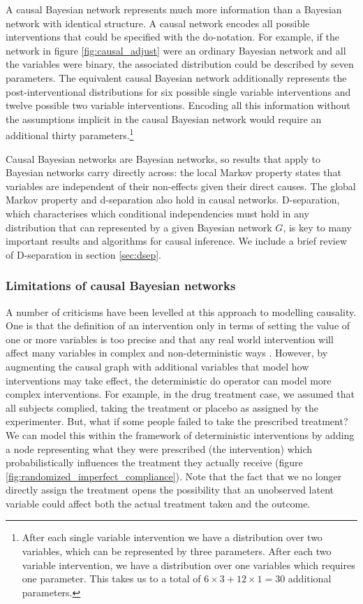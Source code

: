 \documentclass[11pt,a4paper,twoside]{report}
\theoremstyle{plain}
\theoremstyle{definition}
\begin{document}
A causal Bayesian network represents much more information than a Bayesian network with identical structure. A causal network encodes all possible interventions that could be specified with the do-notation. For example, if the network in figure \ref{fig:causal_adjust} were an ordinary Bayesian network and all the variables were binary, the associated distribution could be described by seven parameters. The equivalent causal Bayesian network additionally represents the post-interventional distributions for six possible single variable interventions and twelve possible two variable interventions. Encoding all this information without the assumptions implicit in the causal Bayesian network would require an additional thirty parameters.\footnote{After each single variable intervention we have a distribution over two variables, which can be represented by three parameters. After each two variable intervention, we have a distribution over one variables which requires one parameter. This takes us to a total of $6\times3+12\times1 = 30$ additional parameters.}

Causal Bayesian networks are Bayesian networks, so results that apply to Bayesian networks carry directly across: the local Markov property states that variables are independent of their non-effects given their direct causes. The global Markov property and d-separation also hold in causal networks. D-separation, which characterises which conditional independencies must hold in any distribution that can represented by a given Bayesian network $G$, is key to many important results and algorithms for causal inference. We include a brief review of D-separation in section \ref{sec:dsep}. 


\subsubsection{Limitations of causal Bayesian networks}
A number of criticisms have been levelled at this approach to modelling causality. One is that the definition of an intervention only in terms of setting the value of one or more variables is too precise and that any real world intervention will affect many variables in complex and non-deterministic ways \citep{rickles2009causality,cartwright2007hunting}. However, by augmenting the causal graph with additional variables that model how interventions may take effect, the deterministic do operator can model more complex interventions. For example, in the drug treatment case, we assumed that all subjects complied, taking the treatment or placebo as assigned by the experimenter. But, what if some people failed to take the prescribed treatment? We can model this within the framework of deterministic interventions by adding a node representing what they were prescribed (the intervention) which probabilistically influences the treatment they actually receive (figure \ref{fig:randomized_imperfect_compliance}). Note that the fact that we no longer directly assign the treatment opens the possibility that an unobserved latent variable could affect both the actual treatment taken and the outcome.
\end{document}
